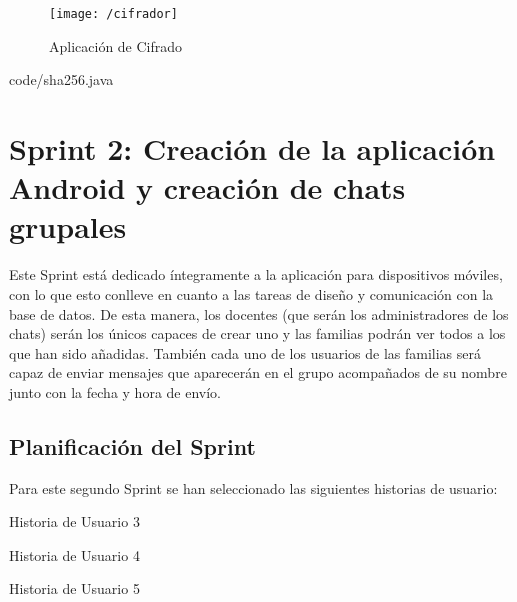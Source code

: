 \begin{figure}[!h]
	\begin{center}
		\texttt{[image: /cifrador]}
		\caption{Aplicación de Cifrado}
		\label{fig:cifrador}
	\end{center}
\end{figure}

\clearpage


						{code/sha256.java}

\clearpage

\section{Sprint 2: Creación de la aplicación Android y creación de chats grupales}
Este Sprint está dedicado íntegramente a la aplicación para dispositivos móviles, con lo que esto conlleve en cuanto a las tareas de diseño y comunicación con la base de datos. De esta manera, los docentes (que serán los administradores de los chats) serán los únicos capaces de crear uno y las familias podrán ver todos a los que han sido añadidas. También cada uno de los usuarios de las familias será capaz de enviar mensajes que aparecerán en el grupo acompañados de su nombre junto con la fecha y hora de envío.

\subsection{Planificación del Sprint}
Para este segundo Sprint se han seleccionado las siguientes historias de usuario:

\begin{table}[!htbp]
	\centering
	{\small
		
	}
	\caption[Historia de Usuario 3]
	{Historia de Usuario 3}
	\label{tab:historia3}
\end{table}

\begin{table}[!htbp]
	\centering
	{\small
		
	}
	\caption[Historia de Usuario 4]
	{Historia de Usuario 4}
	\label{tab:historia4}
\end{table}

\begin{table}[!htbp]
	\centering
	{\small
		
	}
	\caption[Historia de Usuario 5]
	{Historia de Usuario 5}
	\label{tab:historia5}
\end{table}

